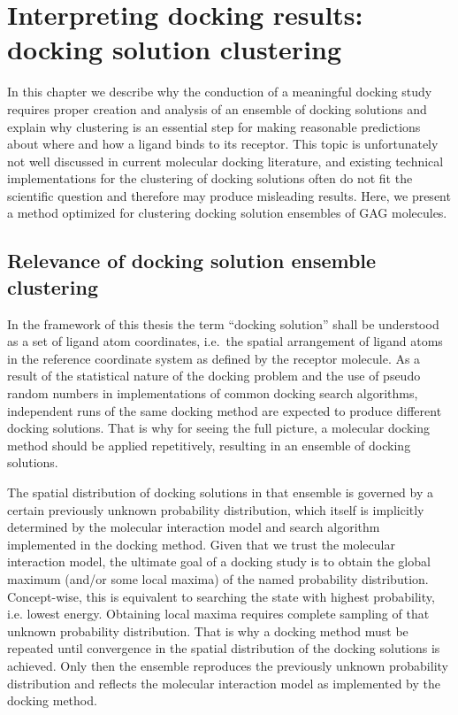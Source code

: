 \chapter{Interpreting docking results: docking solution clustering}
\label{chapter:clustering}

In this chapter we describe why the conduction of a meaningful docking study
requires proper creation and analysis of an ensemble of docking solutions and
explain why clustering is an essential step for making reasonable predictions
about where and how a ligand binds to its receptor. This topic is unfortunately
not well discussed in current molecular docking literature, and existing
technical implementations for the clustering of docking solutions often do not
fit the scientific question and therefore may produce misleading results. Here,
we present a method optimized for clustering docking solution ensembles of GAG
molecules.

\section{Relevance of docking solution ensemble clustering}
\label{relevance_of_clustering}

In the framework of this thesis the term \enquote{docking solution} shall be
understood as a set of ligand atom coordinates, i.e.\ the spatial arrangement of
ligand atoms in the reference coordinate system as defined by the receptor
molecule. As a result of the statistical nature of the docking problem and the
use of pseudo random numbers in implementations of common docking search
algorithms, independent runs of the same docking method are expected to produce
different docking solutions. That is why for seeing the full picture, a
molecular docking method should be applied repetitively, resulting in an
ensemble of docking solutions.

The spatial distribution of docking solutions in that ensemble is governed by a
certain previously unknown probability distribution, which itself is implicitly
determined by the molecular interaction model and search algorithm implemented
in the docking method. Given that we trust the molecular interaction model, the
ultimate goal of a docking study is to obtain the global maximum (and/or some
local maxima) of the named probability distribution. Concept-wise, this is
equivalent to searching the state with highest probability, i.e. lowest energy.
Obtaining local maxima requires complete sampling of that unknown probability
distribution. That is why a docking method must be repeated until convergence
in the spatial distribution of the docking solutions is achieved. Only then the
ensemble reproduces the previously unknown probability distribution and reflects
the molecular interaction model as implemented by the docking method.

